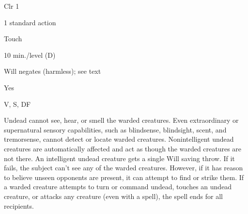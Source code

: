 
\begin{description*}
\item[Level:] Clr 1
\item[Casting Time:] 1 standard action
\item[Range:] Touch
\item[Duration:] 10 min./level (D)
\item[Saving Throw:] Will negates (harmless); see text
\item[Spell Resistance:] Yes
\item[Components:] V, S, DF
\end{description*}

Undead cannot see, hear, or smell the warded creatures. Even extraordinary or supernatural
sensory capabilities, such as blindsense, blindsight, scent, and tremorsense, cannot
detect or locate warded creatures. Nonintelligent undead creatures are automatically
affected and act as though the warded creatures are not there. An intelligent undead
creature gets a single Will saving throw. If it fails, the subject can't see any
of the warded creatures. However, if it has reason to believe unseen opponents
are present, it can attempt to find or strike them. If a warded creature attempts
to turn or command undead, touches an undead creature, or attacks any creature
(even with a spell), the spell ends for all recipients.